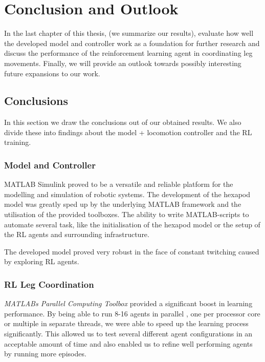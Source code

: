 \chapter{Conclusion and Outlook}
\label{ch:conclusion}

In the last chapter of this thesis, (we summarize our results), evaluate how well the developed model and controller work as a foundation for further research and discuss the performance of the reinforcement learning agent in coordinating leg movements.
Finally, we will provide an outlook towards possibly interesting future expansions to our work.


\section{Conclusions}
In this section we draw the conclusions out of our obtained results.
We also divide these into findings about the model + locomotion controller and the RL training.

\subsection{Model and Controller}
MATLAB Simulink proved to be a versatile and reliable platform for the modelling and simulation of robotic systems.
The development of the hexapod model was greatly sped up by the underlying MATLAB framework and the utilisation of the provided toolboxes.
The ability to write MATLAB-scripts to automate several task, like the initialisation of the hexapod model or the setup of the RL agents and surrounding infrastructure. 

The developed model proved very robust in the face of constant twitching caused by exploring RL agents.

\subsection{RL Leg Coordination}
\textit{MATLABs Parallel Computing Toolbox} provided a significant boost in learning performance.
By being able to run 8-16 agents in parallel , one per processor core or multiple in separate threads, we were able to speed up the learning process significantly.
This allowed us to test several different agent configurations in an acceptable amount of time and also enabled us to refine well performing agents by running more episodes.

